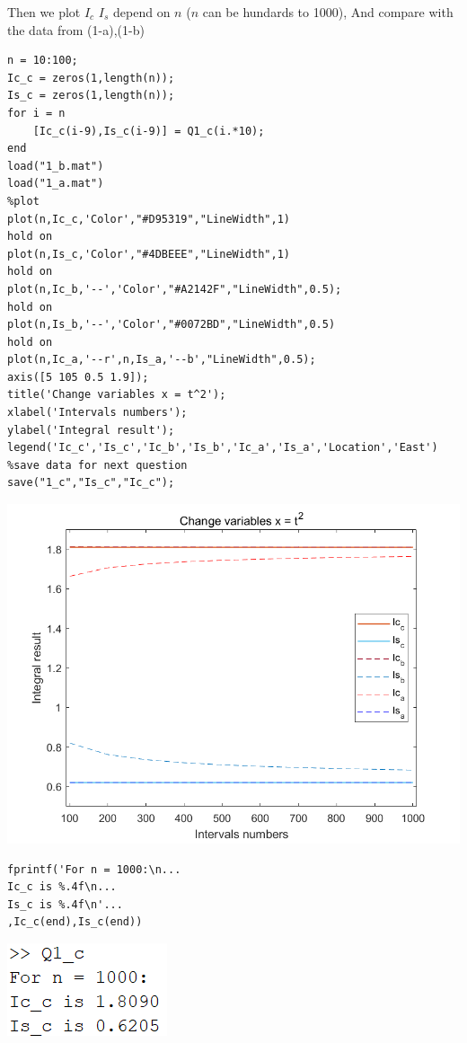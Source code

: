 \documentclass{article}
\begin{document}
\begin{flushleft}
\begin{enumerate}
\begin{framed}
\newpage
Then we plot \(I_{c}\) \(I_{s}\) depend on \(n\) (\(n\) can be hundards to 1000), And compare with the data from (1-a),(1-b)
\newline
\begin{verbatim}
n = 10:100;
Ic_c = zeros(1,length(n));
Is_c = zeros(1,length(n));
for i = n
    [Ic_c(i-9),Is_c(i-9)] = Q1_c(i.*10);
end
load("1_b.mat")
load("1_a.mat")
%plot
plot(n,Ic_c,'Color',"#D95319","LineWidth",1)
hold on
plot(n,Is_c,'Color',"#4DBEEE","LineWidth",1)
hold on
plot(n,Ic_b,'--','Color',"#A2142F","LineWidth",0.5);
hold on
plot(n,Is_b,'--','Color',"#0072BD","LineWidth",0.5)
hold on
plot(n,Ic_a,'--r',n,Is_a,'--b',"LineWidth",0.5);
axis([5 105 0.5 1.9]);
title('Change variables x = t^2');
xlabel('Intervals numbers');
ylabel('Integral result');
legend('Ic_c','Is_c','Ic_b','Is_b','Ic_a','Is_a','Location','East')
%save data for next question
save("1_c","Is_c","Ic_c");
\end{verbatim}
\begin{multicols}{2}
\includegraphics[width={\linewidth}]{Q1_c.png}
\columnbreak
\begin{verbatim}
fprintf('For n = 1000:\n...
Ic_c is %.4f\n...
Is_c is %.4f\n'...
,Ic_c(end),Is_c(end))
\end{verbatim}
\includegraphics[width={0.4\linewidth}]{Q1_c_sol.png}
\end{multicols}


\end{framed}
\end{enumerate}
\end{flushleft}
\end{document}
